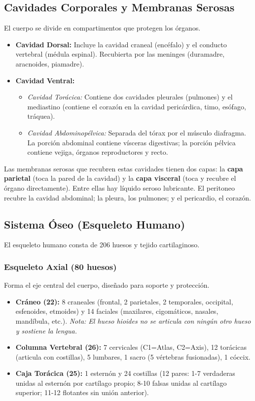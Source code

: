 \subsection{Cavidades Corporales y Membranas Serosas}
El cuerpo se divide en compartimentos que protegen los órganos.
\begin{itemize}
    \item \textbf{Cavidad Dorsal:} Incluye la cavidad craneal (encéfalo) y el conducto vertebral (médula espinal). Recubierta por las meninges (duramadre, aracnoides, piamadre).
    \item \textbf{Cavidad Ventral:} 
    \begin{itemize}
        \item \textit{Cavidad Torácica:} Contiene dos cavidades pleurales (pulmones) y el mediastino (contiene el corazón en la cavidad pericárdica, timo, esófago, tráquea).
        \item \textit{Cavidad Abdominopélvica:} Separada del tórax por el músculo diafragma. La porción abdominal contiene vísceras digestivas; la porción pélvica contiene vejiga, órganos reproductores y recto.
    \end{itemize}
\end{itemize}
\begin{tcolorbox}[colback=blue!5!white,colframe=blue!75!black,title=Dato EXANI-II]
Las membranas serosas que recubren estas cavidades tienen dos capas: la \textbf{capa parietal} (toca la pared de la cavidad) y la \textbf{capa visceral} (toca y recubre el órgano directamente). Entre ellas hay líquido seroso lubricante. El peritoneo recubre la cavidad abdominal; la pleura, los pulmones; y el pericardio, el corazón.
\end{tcolorbox}

\subsection{Sistema Óseo (Esqueleto Humano)}
El esqueleto humano consta de 206 huesos y tejido cartilaginoso.
\subsubsection{Esqueleto Axial (80 huesos)}
Forma el eje central del cuerpo, diseñado para soporte y protección.
\begin{itemize}
    \item \textbf{Cráneo (22):} 8 craneales (frontal, 2 parietales, 2 temporales, occipital, esfenoides, etmoides) y 14 faciales (maxilares, cigomáticos, nasales, mandíbula, etc.). \textit{Nota: El hueso hioides no se articula con ningún otro hueso y sostiene la lengua.}
    \item \textbf{Columna Vertebral (26):} 7 cervicales (C1=Atlas, C2=Axis), 12 torácicas (articula con costillas), 5 lumbares, 1 sacro (5 vértebras fusionadas), 1 cóccix.
    \item \textbf{Caja Torácica (25):} 1 esternón y 24 costillas (12 pares: 1-7 verdaderas unidas al esternón por cartílago propio; 8-10 falsas unidas al cartílago superior; 11-12 flotantes sin unión anterior).
\end{itemize}

